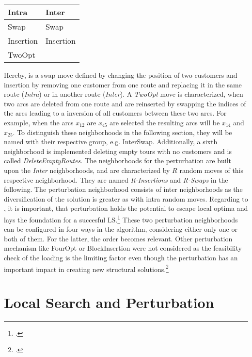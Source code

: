 \begin{table}[ht]
    \centering
    \begin{tabular}{@{}P{0.3\textwidth}P{0.3\textwidth}@{}}
        \toprule
        \textbf{Intra} & \textbf{Inter} \\
        \midrule
        Swap           & Swap           \\
        Insertion      & Insertion      \\
        TwoOpt         &                \\
        \bottomrule
    \end{tabular}
\end{table}
Hereby, is a swap move defined by changing the position of two customers and insertion by removing one customer from one route
and replacing it in the same route (\textit{Intra}) or in another route (\textit{Inter}). A \textit{TwoOpt} move is characterized, when two arcs are deleted
from one route and are reinserted by swapping the indices of the arcs leading to a inversion of all customers between these two arcs.
For example, when the arcs $x_{12}$ are $x_{45}$ are selected the resulting arcs will be $x_{14}$ and $x_{25}$. To distinguish these
neighborhoods in the following section, they will be named with their respective group, e.g. InterSwap. Additionally, a sixth
neighborhood is implemented deleting empty tours with no customers and is called \textit{DeleteEmptyRoutes}.
The neighborhoods for the perturbation are built upon the \textit{Inter} neighborhoods, and are characterized by $R$ random moves of
this respective neighborhood. They are named \textit{R-Insertions} and \textit{R-Swaps} in the
following. The perturbation neighborhood consists of inter neighborhoods as the diversification of the solution is
greater as with intra random moves. Regarding to \cite{lourenco_iterated_2003}, it is important, that perturbation holds the potential
to escape local optima and lays the foundation for a succesful \gls{LS}.\footcite[cf.][p. 329f]{lourenco_iterated_2003} These two perturbation neighborhoods
can be configured in four ways in the algorithm, considering either only one or both of them. For the latter, the order becomes relevant.
Other perturbation mechanism like FourOpt or BlockInsertion were not considered as the feasibility check of the loading is the limiting factor even though
the perturbation has an important impact in creating new structural solutions.\footcite[cf.][pp. 329--332]{lourenco_iterated_2003}

\section{Local Search and Perturbation}
\label{sec:LSandPerturbation}

